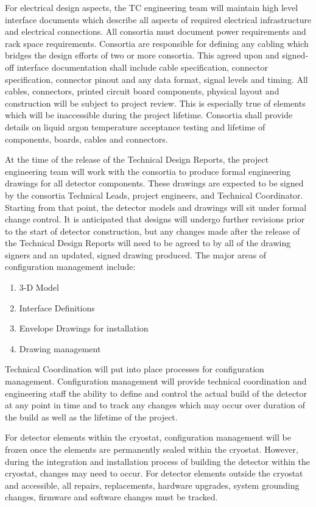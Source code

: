 For electrical design aspects, the TC engineering team will maintain
high level interface documents which describe all aspects of required
electrical infrastructure and electrical connections. All consortia
must document power requirements and rack space
requirements. Consortia are responsible for defining any cabling which
bridges the design efforts of two or more consortia. This agreed upon
and signed-off interface documentation shall include cable
specification, connector specification, connector pinout and any data
format, signal levels and timing. All cables, connectors, printed
circuit board components, physical layout and construction will be
subject to project review. This is especially true of elements which
will be inaccessible during the project lifetime. Consortia shall
provide details on liquid argon temperature acceptance testing and
lifetime of components, boards, cables and connectors.


At the time of the release of the Technical Design Reports, the
project engineering team will work with the consortia to produce
formal engineering drawings for all detector components.  These
drawings are expected to be signed by the consortia Technical Leads,
project engineers, and Technical Coordinator.  Starting from that
point, the detector models and drawings will sit under formal change
control.  It is anticipated that designs will undergo further
revisions prior to the start of detector construction, but any changes
made after the release of the Technical Design Reports will need to be
agreed to by all of the drawing signers and an updated, signed drawing
produced. The major areas of configuration management include:
\begin{enumerate}
  \item 3-D Model
  \item Interface Definitions
  \item Envelope Drawings for installation
  \item Drawing management
\end{enumerate}

Technical Coordination will put into place processes for
configuration management.  Configuration management will provide
technical coordination and engineering staff the ability to define and
control the actual build of the detector at any point in time and to
track any changes which may occur over duration of the build as well
as the lifetime of the project.

For detector elements within the cryostat, configuration management
will be frozen once the elements are permanently sealed within the
cryostat.  However, during the integration and installation process of
building the detector within the cryostat, changes may need to occur.
For detector elements outside the cryostat and accessible, all
repairs, replacements, hardware upgrades, system grounding changes,
firmware and software changes must be tracked.

